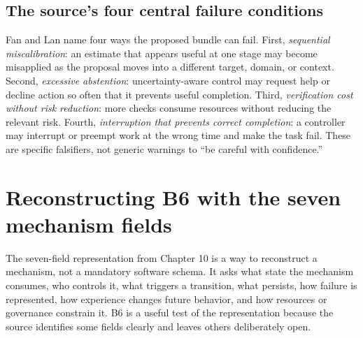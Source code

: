 \subsection{The source's four central failure conditions}

Fan and Lan name four ways the proposed bundle can fail. First, \emph{sequential miscalibration}: an estimate that appears useful at one stage may become misapplied as the proposal moves into a different target, domain, or context. Second, \emph{excessive abstention}: uncertainty-aware control may request help or decline action so often that it prevents useful completion. Third, \emph{verification cost without risk reduction}: more checks consume resources without reducing the relevant risk. Fourth, \emph{interruption that prevents correct completion}: a controller may interrupt or preempt work at the wrong time and make the task fail. These are specific falsifiers, not generic warnings to ``be careful with confidence.''

\section{Reconstructing B6 with the seven mechanism fields}
\label{sec:ch16-seven-fields}

The seven-field representation from Chapter 10 is a way to reconstruct a mechanism, not a mandatory software schema. It asks what state the mechanism consumes, who controls it, what triggers a transition, what persists, how failure is represented, how experience changes future behavior, and how resources or governance constrain it. B6 is a useful test of the representation because the source identifies some fields clearly and leaves others deliberately open.

